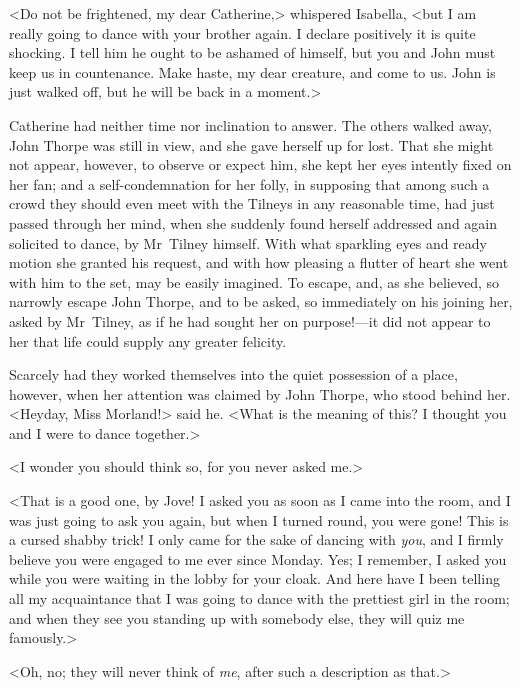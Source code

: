  <Do not be frightened, my dear Catherine,> whispered Isabella, <but I am really going to dance with your brother again. I declare positively it is quite shocking. I tell him he ought to be ashamed of himself, but you and John must keep us in countenance. Make haste, my dear creature, and come to us. John is just walked off, but he will be back in a moment.> 

 Catherine had neither time nor inclination to answer. The others walked away, John Thorpe was still in view, and she gave herself up for lost. That she might not appear, however, to observe or expect him, she kept her eyes intently fixed on her fan; and a self-condemnation for her folly, in supposing that among such a crowd they should even meet with the Tilneys in any reasonable time, had just passed through her mind, when she suddenly found herself addressed and again solicited to dance, by Mr~Tilney himself. With what sparkling eyes and ready motion she granted his request, and with how pleasing a flutter of heart she went with him to the set, may be easily imagined. To escape, and, as she believed, so narrowly escape John Thorpe, and to be asked, so immediately on his joining her, asked by Mr~Tilney, as if he had sought her on purpose!—it did not appear to her that life could supply any greater felicity. 

 Scarcely had they worked themselves into the quiet possession of a place, however, when her attention was claimed by John Thorpe, who stood behind her. <Heyday, Miss Morland!> said he. <What is the meaning of this? I thought you and I were to dance together.> 

 <I wonder you should think so, for you never asked me.> 

 <That is a good one, by Jove! I asked you as soon as I came into the room, and I was just going to ask you again, but when I turned round, you were gone! This is a cursed shabby trick! I only came for the sake of dancing with \textit{you}, and I firmly believe you were engaged to me ever since Monday. Yes; I remember, I asked you while you were waiting in the lobby for your cloak. And here have I been telling all my acquaintance that I was going to dance with the prettiest girl in the room; and when they see you standing up with somebody else, they will quiz me famously.> 

 <Oh, no; they will never think of \textit{me}, after such a description as that.> 

